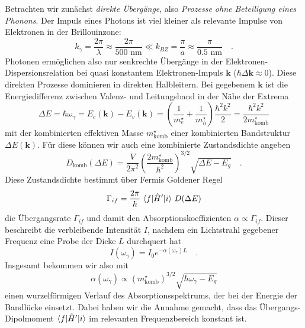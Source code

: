 Betrachten wir zunächst \emph{direkte Übergänge}, also \emph{Prozesse ohne Beteiligung eines Phonons}. Der Impuls eines Photons ist viel kleiner als relevante Impulse von Elektronen in der Brillouinzone:
\begin{equation}
    k_\gamma = \frac{2 \pi }{\lambda} \approx \frac{2 \pi }{500\text{ nm}}
    \ll k_{BZ} = \frac{\pi}{a} \approx \frac{\pi}{0.5 \text{ nm}} \quad .
\end{equation}
Photonen ermöglichen also nur senkrechte Übergänge in der Elektronen-Dispersionsrelation bei quasi konstantem Elektronen-Impuls $\mathbf{k}$ ($\hbar \Delta \mathbf{k} \approx 0$). Diese direkten Prozesse dominieren in direkten Halbleitern. Bei gegebenem $\mathbf{k}$ ist die Energiedifferenz zwischen Valenz- und Leitungsband in der Nähe der Extrema
\begin{equation}
    \Delta E = \hbar \omega_\gamma = E_c(\mathbf{k})-  E_v(\mathbf{k}) = 
    \left( \frac{1}{m_e^\star} + \frac{1}{m_h^\star} \right) \frac{\hbar^2 k^2}{2} =  \frac{\hbar^2 k^2}{2 m^\star_\text{komb}}
\end{equation}
mit der kombinierten effektiven Masse $m^\star_\text{komb}$ einer kombinierten Bandstruktur $ \Delta E(\mathbf{k})$. Für diese können wir auch eine kombinierte Zustandsdichte angeben
\begin{equation}
    D_\text{komb}( \Delta E) = \frac{V}{2 \pi^2} \left( \frac{2 m^\star_\text{komb}}{\hbar^2} \right)^{3/2} \sqrt{\Delta E - E_g} \quad .
\end{equation}
Diese Zustandsdichte bestimmt über  Fermis  Goldener Regel
\begin{equation}
            \Gamma_{if} = \frac{2 \pi}{\hbar} \, \braket{f | \hat{H}' | i} \, D( \Delta E)
\end{equation}
 die Übergangsrate $\Gamma_{if}$ und damit den Absorptionskoeffizienten $\alpha \propto \Gamma_{if}$. Dieser beschreibt die verbleibende Intensität $I$, nachdem ein Lichtstrahl gegebener Frequenz eine Probe der Dicke $L$ durchquert hat
\begin{equation}
    I(\omega_\gamma) = I_0 e^{- \alpha(\omega_\gamma) L} \quad .
\end{equation}
Insgesamt bekommen wir also mit
\begin{equation}
    \alpha(\omega_\gamma) \propto ( m^\star_\text{komb})^{3/2}  \sqrt{\hbar \omega_\gamma - E_g} \label{eq:5_absorption_direct_HL}
\end{equation}
einen wurzelförmigen Verlauf des Absorptionsspektrums, der bei der Energie der Bandlücke einsetzt. Dabei haben wir die Annahme gemacht, dass  das Übergangs-Dipolmoment $\braket{f | \hat{H}' | i} $  im relevanten Frequenzbereich konstant ist.

